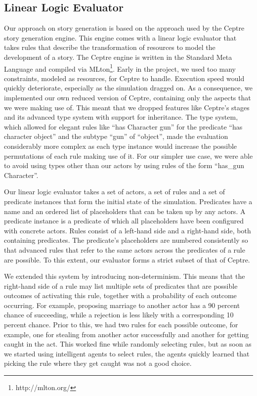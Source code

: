 \subsection{Linear Logic Evaluator}\label{own_linear_logic_evaluator}

Our approach on story generation is based on the approach used by the Ceptre story generation engine.
This engine comes with a linear logic evaluator that takes rules that describe the transformation of resources to model the development of a story.
The Ceptre engine is written in the Standard Meta Language and compiled via MLton\footnote{http://mlton.org/}.
Early in the project, we used too many constraints, modeled as resources, for Ceptre to handle.
Execution speed would quickly deteriorate, especially as the simulation dragged on.
As a consequence, we implemented our own reduced version of Ceptre, containing only the aspects that we were making use of.
This meant that we dropped features like Ceptre's stages and its advanced type system with support for inheritance.
The type system, which allowed for elegant rules like \enquote{has Character gun} for the predicate \enquote{has character object} and the subtype \enquote{gun} of \enquote{object}, made the evaluation considerably more complex as each type instance would increase the possible permutations of each rule making use of it.
For our simpler use case, we were able to avoid using types other than our actors by using rules of the form \enquote{has\_gun Character}.

Our linear logic evaluator takes a set of actors, a set of rules and a set of predicate instances that form the initial state of the simulation.
Predicates have a name and an ordered list of placeholders that can be taken up by any actors.
A predicate instance is a predicate of which all placeholders have been configured with concrete actors.
Rules consist of a left-hand side and a right-hand side, both containing predicates.
The predicate's placeholders are numbered consistently so that advanced rules that refer to the same actors across the predicates of a rule are possible.
To this extent, our evaluator forms a strict subset of that of Ceptre. 

We extended this system by introducing non-determinism. This means that the right-hand side of a rule may list multiple sets of predicates that are possible outcomes of activating this rule, together with a probability of each outcome occurring.
For example, proposing marriage to another actor has a 90 percent chance of succeeding, while a rejection is less likely with a corresponding 10 percent chance.
Prior to this, we had two rules for each possible outcome, for example, one for stealing from another actor successfully and another for getting caught in the act. This worked fine while randomly selecting rules, but as soon as we started using intelligent agents to select rules, the agents quickly learned that picking the rule where they get caught was not a good choice.

